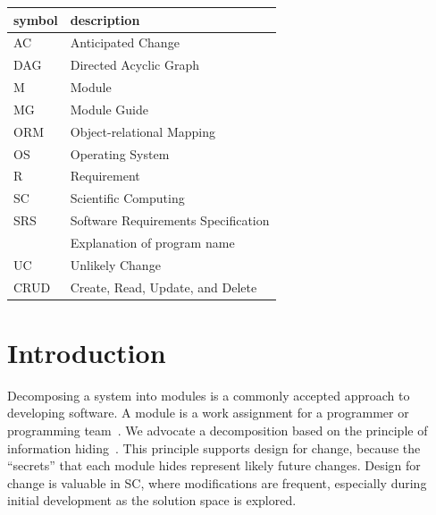\documentclass[12pt, titlepage]{article}
\begin{document}
\renewcommand{\arraystretch}{1.2}
\begin{tabular}{l l}
	\toprule
	\textbf{symbol} & \textbf{description}                \\
	\midrule
	AC              & Anticipated Change                  \\
	DAG             & Directed Acyclic Graph              \\
	M               & Module                              \\
	MG              & Module Guide                        \\
	ORM             & Object-relational Mapping           \\
	OS              & Operating System                    \\
	R               & Requirement                         \\
	SC              & Scientific Computing                \\
	SRS             & Software Requirements Specification \\
	\progname       & Explanation of program name         \\
	UC              & Unlikely Change                     \\
	CRUD            & Create, Read, Update, and Delete    \\
	\bottomrule
\end{tabular}

\newpage

\tableofcontents

\newpage

\listoftables

\listoffigures

\newpage


\section{Introduction}

Decomposing a system into modules is a commonly accepted approach to developing software. A module
is a work assignment for a programmer or programming team~\citep{ParnasEtAl1984}. We advocate a
decomposition based on the principle of information hiding~\citep{Parnas1972a}. This principle
supports design for change, because the ``secrets'' that each module hides represent likely future
changes. Design for change is valuable in SC, where modifications are frequent, especially during
initial development as the solution space is explored.
\end{document}

